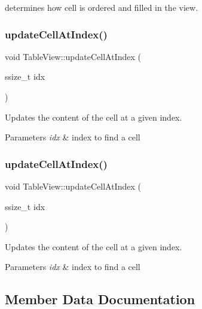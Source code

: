 determines how cell is ordered and filled in the view. \mbox{\label{classTableView_a98a5e4c9b7c7841fb9ecb15604bd3dc5}} 
\subsubsection{\texorpdfstring{update\+Cell\+At\+Index()}{updateCellAtIndex()}\hspace{0.1cm}{\footnotesize\ttfamily [1/2]}}
{\footnotesize\ttfamily void Table\+View\+::update\+Cell\+At\+Index (\begin{DoxyParamCaption}\item[{ssize\+\_\+t}]{idx }\end{DoxyParamCaption})}

Updates the content of the cell at a given index.


\begin{DoxyParams}{Parameters}
{\em idx} & index to find a cell \\
\hline
\end{DoxyParams}
\mbox{\label{classTableView_a98a5e4c9b7c7841fb9ecb15604bd3dc5}} 
\subsubsection{\texorpdfstring{update\+Cell\+At\+Index()}{updateCellAtIndex()}\hspace{0.1cm}{\footnotesize\ttfamily [2/2]}}
{\footnotesize\ttfamily void Table\+View\+::update\+Cell\+At\+Index (\begin{DoxyParamCaption}\item[{ssize\+\_\+t}]{idx }\end{DoxyParamCaption})}

Updates the content of the cell at a given index.


\begin{DoxyParams}{Parameters}
{\em idx} & index to find a cell \\
\hline
\end{DoxyParams}


\subsection{Member Data Documentation}
\mbox{\label{classTableView_a401a2ee88c8b610ffe98e761a7ae7612}} 
